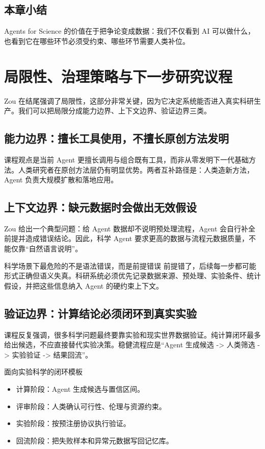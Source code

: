 \documentclass[a4paper]{article}
\begin{document}
\subsection{本章小结}

Agents for Science 的价值在于把争论变成数据：我们不仅看到 AI 可以做什么，也看到它在哪些环节必须受约束、哪些环节需要人类补位。

\section{局限性、治理策略与下一步研究议程}

Zou 在结尾强调了局限性，这部分非常关键，因为它决定系统能否进入真实科研生产。我们可以把局限分成能力边界、上下文边界、验证边界三类。

\subsection{能力边界：擅长工具使用，不擅长原创方法发明}

课程观点是当前 Agent 更擅长调用与组合既有工具，而非从零发明下一代基础方法。人类研究者在原创方法层仍有明显优势。两者互补路径是：人类造新方法，Agent 负责大规模扩散和落地应用。

\subsection{上下文边界：缺元数据时会做出无效假设}

Zou 给出一个典型问题：给 Agent 数据却不说明预处理流程，Agent 会自行补全前提并造成错误结论。因此，科学 Agent 要求更高的数据与流程元数据质量，不能仅靠``自然语言说明''。

\begin{warningbox}{科学场景下最危险的不是语法错误，而是前提错误}
前提错了，后续每一步都可能形式正确但语义失真。科研系统必须优先记录数据来源、预处理、实验条件、统计假设，并把这些信息纳入 Agent 的硬约束上下文。
\end{warningbox}

\subsection{验证边界：计算结论必须闭环到真实实验}

课程反复强调，很多科学问题最终要靠实验和现实世界数据验证。纯计算闭环最多给出候选，不应直接替代实验决策。稳健流程应是``Agent 生成候选 -> 人类筛选 -> 实验验证 -> 结果回流''。

\begin{knowledgebox}{面向实验科学的闭环模板}
\begin{itemize}
    \item 计算阶段：Agent 生成候选与置信区间。
    \item 评审阶段：人类确认可行性、伦理与资源约束。
    \item 实验阶段：按预注册协议执行验证。
    \item 回流阶段：把失败样本和异常元数据写回记忆库。
\end{itemize}
\end{knowledgebox}
\end{document}
